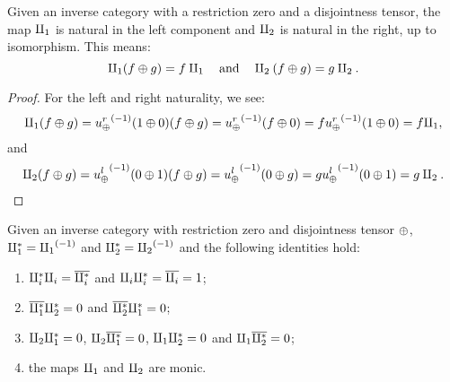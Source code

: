 \begin{lemma}\label{lem:disjointness_tensor_has_injections}
  Given an inverse category \X with a restriction zero and a disjointness tensor, the map $\amalg_{1}$ is
  natural in the left component and $\amalg_{2}$ is natural in the right, up to isomorphism. This means:
  \[
    \amalg_{1} (f\oplus g) = f \amalg_{1} \quad\text{and}\quad \amalg_{2} (f\oplus g) = g \amalg_{2}.
  \]
\end{lemma}
\begin{proof}
  For the left and right naturality, we see:
  \[
    \amalg_{1} (f\oplus g) = {u_{\oplus}^r}^{(-1)} (1\oplus0) (f\oplus g) = {u_{\oplus}^r}^{(-1)} (f \oplus 0) =
      f {u_{\oplus}^r}^{(-1)} (1\oplus0) = f \amalg_{1},
  \]
  and
  \[
    \amalg_{2} (f\oplus g) = {u_{\oplus}^l}^{(-1)} (0\oplus1) (f\oplus g) = {u_{\oplus}^l}^{(-1)} (0 \oplus g) =
      g {u_{\oplus}^l}^{(-1)} (0\oplus1) = g \amalg_{2}.
  \]
\end{proof}

\begin{lemma}\label{lem:tensor_identities}
  Given an inverse category \X with restriction zero and disjointness tensor $\oplus$,
  $\amalg_{1}^{*} = {\amalg_{1}}^{(-1)}$ and $\amalg_{2}^{*} = {\amalg_{2}}^{(-1)}$ and the following identities hold:
  \begin{enumerate}[{(}i{)}]
    \item $\amalg_{i}^{*} \amalg_{i} = \overline{\amalg_{i}^{*}}$ and $\amalg_{i}\amalg_{i}^{*} = \overline{\amalg_{i}} = 1$;\label{lemitem:disjointness_tensor_identities_1}
    \item $\overline{\amalg_{1}^{*}} \amalg_{2}^{*} = 0$ and $\overline{\amalg_{2}^{*}} \amalg_{1}^{*} = 0$;\label{lemitem:disjointness_tensor_identities_2}
    \item $\amalg_{2} \amalg_{1}^{*} = 0$, $\amalg_{2} \overline{\amalg_{1}^{*}} = 0$,  $\amalg_{1} \amalg_{2}^{*} = 0$ and
      $\amalg_{1} \overline{\amalg_{2}^{*}} = 0$;\label{lemitem:disjointness_tensor_identities_3}
    \item the maps $\amalg_{1}$ and $\amalg_{2}$ are monic.\label{lemitem:disjointness_tensor_identities_4}
  \end{enumerate}
\end{lemma}
